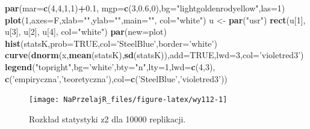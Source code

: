 \documentclass[polish,]{book}
\newenvironment{Shaded}{\begin{snugshade}}{\end{snugshade}}
\newcommand{\DataTypeTok}[1]{\textcolor[rgb]{0.13,0.29,0.53}{#1}}
\newcommand{\DecValTok}[1]{\textcolor[rgb]{0.00,0.00,0.81}{#1}}
\newcommand{\FloatTok}[1]{\textcolor[rgb]{0.00,0.00,0.81}{#1}}
\newcommand{\KeywordTok}[1]{\textcolor[rgb]{0.13,0.29,0.53}{\textbf{#1}}}
\newcommand{\NormalTok}[1]{#1}
\newcommand{\OperatorTok}[1]{\textcolor[rgb]{0.81,0.36,0.00}{\textbf{#1}}}
\newcommand{\OtherTok}[1]{\textcolor[rgb]{0.56,0.35,0.01}{#1}}
\newcommand{\StringTok}[1]{\textcolor[rgb]{0.31,0.60,0.02}{#1}}
\begin{document}
\begin{Shaded}
\begin{Highlighting}[]
\KeywordTok{par}\NormalTok{(}\DataTypeTok{mar=}\KeywordTok{c}\NormalTok{(}\DecValTok{4}\NormalTok{,}\DecValTok{4}\NormalTok{,}\DecValTok{1}\NormalTok{,}\DecValTok{1}\NormalTok{)}\OperatorTok{+}\FloatTok{0.1}\NormalTok{, }\DataTypeTok{mgp=}\KeywordTok{c}\NormalTok{(}\DecValTok{3}\NormalTok{,}\FloatTok{0.6}\NormalTok{,}\DecValTok{0}\NormalTok{),}\DataTypeTok{bg=}\StringTok{"lightgoldenrodyellow"}\NormalTok{,}\DataTypeTok{las=}\DecValTok{1}\NormalTok{)}
\KeywordTok{plot}\NormalTok{(}\DecValTok{1}\NormalTok{,}\DataTypeTok{axes=}\NormalTok{F,}\DataTypeTok{xlab=}\StringTok{""}\NormalTok{,}\DataTypeTok{ylab=}\StringTok{""}\NormalTok{,}\DataTypeTok{main=}\StringTok{""}\NormalTok{, }\DataTypeTok{col=}\StringTok{"white"}\NormalTok{)}
\NormalTok{u <-}\StringTok{ }\KeywordTok{par}\NormalTok{(}\StringTok{"usr"}\NormalTok{)}
\KeywordTok{rect}\NormalTok{(u[}\DecValTok{1}\NormalTok{], u[}\DecValTok{3}\NormalTok{], u[}\DecValTok{2}\NormalTok{], u[}\DecValTok{4}\NormalTok{], }\DataTypeTok{col=}\StringTok{"white"}\NormalTok{)}
\KeywordTok{par}\NormalTok{(}\DataTypeTok{new=}\NormalTok{plot)}
\KeywordTok{hist}\NormalTok{(statsK,}\DataTypeTok{prob=}\OtherTok{TRUE}\NormalTok{,}\DataTypeTok{col=}\StringTok{'SteelBlue'}\NormalTok{,}\DataTypeTok{border=}\StringTok{'white'}\NormalTok{)}
\KeywordTok{curve}\NormalTok{(}\KeywordTok{dnorm}\NormalTok{(x,}\KeywordTok{mean}\NormalTok{(statsK),}\KeywordTok{sd}\NormalTok{(statsK)),}\DataTypeTok{add=}\OtherTok{TRUE}\NormalTok{,}\DataTypeTok{lwd=}\DecValTok{3}\NormalTok{,}\DataTypeTok{col=}\StringTok{'violetred3'}\NormalTok{)}
\KeywordTok{legend}\NormalTok{(}\StringTok{"topright"}\NormalTok{,}\DataTypeTok{bg=}\StringTok{'white'}\NormalTok{,}\DataTypeTok{bty=}\StringTok{"n"}\NormalTok{,}\DataTypeTok{lty=}\DecValTok{1}\NormalTok{,}\DataTypeTok{lwd=}\KeywordTok{c}\NormalTok{(}\DecValTok{4}\NormalTok{,}\DecValTok{3}\NormalTok{),}
       \KeywordTok{c}\NormalTok{(}\StringTok{'empiryczna'}\NormalTok{,}\StringTok{'teoretyczna'}\NormalTok{),}\DataTypeTok{col=}\KeywordTok{c}\NormalTok{(}\StringTok{'SteelBlue'}\NormalTok{,}\StringTok{'violetred3'}\NormalTok{))}
\end{Highlighting}
\end{Shaded}

\begin{figure}[h]

{\centering \texttt{[image: NaPrzelajR\_files/figure-latex/wy112-1]} 

}

\caption{Rozkład statystyki z2 dla 10000 replikacji.}\label{fig:wy112}
\end{figure}
\end{document}

